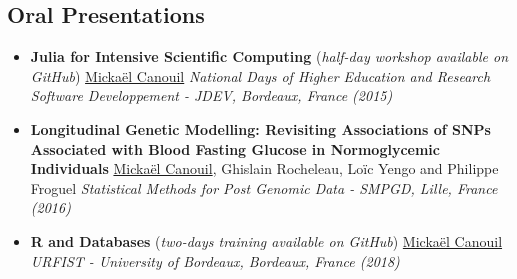 \documentclass[11pt,a4paper,sans]{moderncv}
\begin{document}
\subsection{Oral Presentations}
\begin{itemize}
    \setlength{\itemsep}{0.5em}

    \item \textbf{Julia for Intensive Scientific Computing} (\textit{half-day workshop available on GitHub})
        \newline \underline{Mickaël Canouil}
        \newline \textit{National Days of Higher Education and Research Software Developpement - JDEV, Bordeaux, France (2015)}

    \item \textbf{Longitudinal Genetic Modelling: Revisiting Associations of SNPs Associated with Blood Fasting Glucose in Normoglycemic Individuals}
        \newline \underline{Mickaël Canouil}, Ghislain Rocheleau, Loïc Yengo and Philippe Froguel
        \newline \textit{Statistical Methods for Post Genomic Data - SMPGD, Lille, France (2016)}
    
    \item \textbf{R and Databases} (\textit{two-days training available on GitHub})
        \newline \underline{Mickaël Canouil}
        \newline \textit{URFIST - University of Bordeaux, Bordeaux, France (2018)}

\end{itemize}
\end{document}
